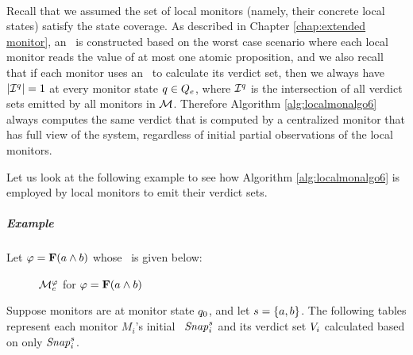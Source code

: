  \ \


Recall that we assumed the set of local monitors (namely, their concrete local states) satisfy the state coverage. As described in Chapter \ref{chap:extended monitor}, an \Exltl~is constructed based on the worst case scenario where each local monitor reads the value of at most one atomic proposition, and we also recall that if each monitor uses an \Exltl~to calculate its verdict set, then we always have $|\mathcal{I}^q| =1$ at every monitor state $q \in Q_e$, where $\mathcal{I}^q$ is the intersection of all verdict sets emitted by all monitors in $\mathcal{M}$. Therefore Algorithm \ref{alg:localmonalgo6} always computes the same verdict that is computed by a centralized monitor that has full view of the system, regardless of initial partial observations of the local monitors.


Let us look at the following example to see how Algorithm \ref{alg:localmonalgo6} is employed by local monitors to emit their verdict sets.



\subparagraph{Example} Let $\varphi = \mathbf{F} (a \wedge b)$ whose \Exltl~is given below: \\


\begin{figure}[H]
\centering
{}    
\caption{$\mathcal{M}_e^\varphi$ for $\varphi = \mathbf{F} (a \wedge b)$} 
\end{figure}
\label{fig:exltla&b}


Suppose monitors are at monitor state $q_0$, and let $s= \{a, b\} $. The following tables represent each monitor $M_i$'s initial \localreg~$\mathit{Snap}_i^s$ and its verdict set $V_i$ calculated based on only $\mathit{Snap}_i^s$.



